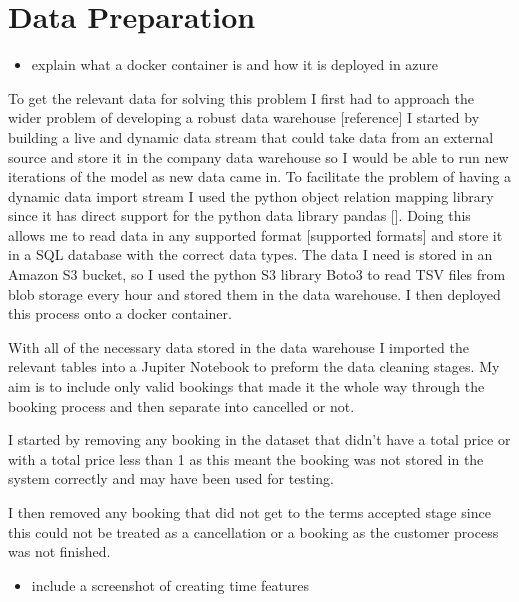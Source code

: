 \section{Data Preparation}

\begin{itemize}
\item explain what a docker container is and how it is deployed in azure 
\end{itemize}


To get the relevant data for solving this problem I first had to approach the wider problem of developing a robust data warehouse [reference] I started by building a live and dynamic data stream that could take data from an external source and store it in the company data warehouse so I would be able to run new iterations of the model as new data came in. To facilitate the problem of having a dynamic data import stream I used the python object relation mapping library \cite{SQLAlchemyPython} since it has direct support for the python data library pandas []. Doing this allows me to read data in any supported format [supported formats] and store it in a SQL database with the correct data types. The data I need is stored in an Amazon S3 bucket, so I used the python S3 library Boto3 to read TSV files from blob storage every hour and stored them in the data warehouse. I then deployed this process onto a docker container.

\vspace{5mm}

With all of the necessary data stored in the data warehouse I imported the relevant tables into a Jupiter Notebook to preform the data cleaning stages. My aim is to include only valid bookings that made it the whole way through the booking process and then separate into cancelled or not.

I started by removing any booking in the dataset that didn't have a total price or with a total price less than 1 as this meant the booking was not stored in the system correctly and may have been used for testing. 

I then removed any booking that did not get to the terms accepted stage since this could not be treated as a cancellation or a booking as the customer process was not finished.

\begin{itemize}
\item include a screenshot of creating time features
\end{itemize}


